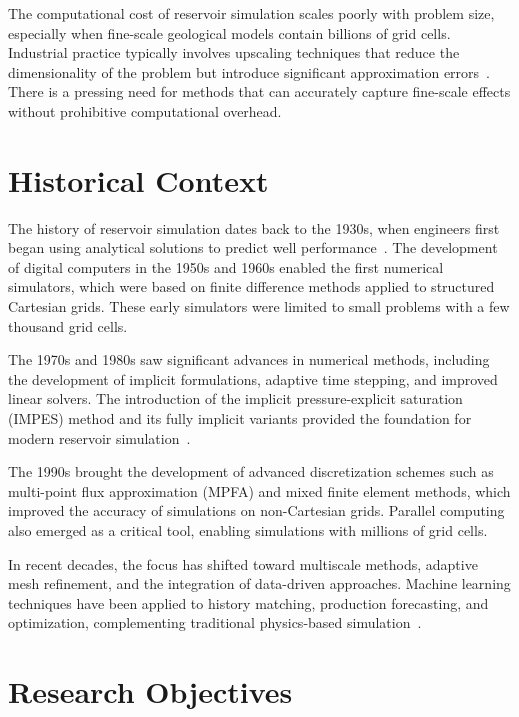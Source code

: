 The computational cost of reservoir simulation scales poorly with problem size, especially when fine-scale geological models contain billions of grid cells. Industrial practice typically involves upscaling techniques that reduce the dimensionality of the problem but introduce significant approximation errors~\cite{goossensLaTeXCompanion1993}. There is a pressing need for methods that can accurately capture fine-scale effects without prohibitive computational overhead.

\section{Historical Context}
\label{sec:introduction:history}

The history of reservoir simulation dates back to the 1930s, when engineers first began using analytical solutions to predict well performance~\cite{knuthFundamentalAlgorithms1973}. The development of digital computers in the 1950s and 1960s enabled the first numerical simulators, which were based on finite difference methods applied to structured Cartesian grids. These early simulators were limited to small problems with a few thousand grid cells.

The 1970s and 1980s saw significant advances in numerical methods, including the development of implicit formulations, adaptive time stepping, and improved linear solvers. The introduction of the implicit pressure-explicit saturation (IMPES) method and its fully implicit variants provided the foundation for modern reservoir simulation~\cite{goossensLaTeXCompanion1993}.

The 1990s brought the development of advanced discretization schemes such as multi-point flux approximation (MPFA) and mixed finite element methods, which improved the accuracy of simulations on non-Cartesian grids. Parallel computing also emerged as a critical tool, enabling simulations with millions of grid cells.

In recent decades, the focus has shifted toward multiscale methods, adaptive mesh refinement, and the integration of data-driven approaches. Machine learning techniques have been applied to history matching, production forecasting, and optimization, complementing traditional physics-based simulation~\cite{mckinneyPythonDataAnalysis2018, ramalhoFluentPython2015}.

\section{Research Objectives}
\label{sec:introduction:objectives}

